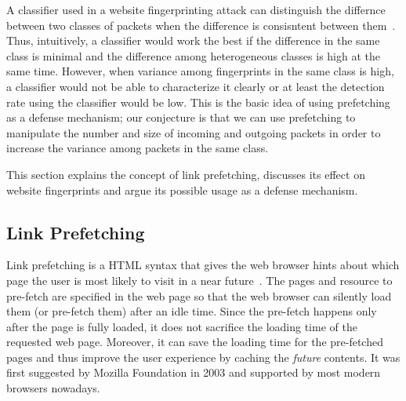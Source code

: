 
A classifier used in a website fingerprinting attack can distinguish the differnce between two classes of packets when the difference is consisntent between them~\cite{Cai:2014kjb}. %
Thus, intuitively, a classifier would work the best if the difference in the same class is minimal and the difference among heterogeneous classes is high at the same time.
However, when variance among fingerprints in the same class is high, a classifier would not be able to characterize it clearly or at least the detection rate using the classifier would be low.
This is the basic idea of using prefetching as a defense mechanism; our conjecture is that we can use prefetching to manipulate the number and size of incoming and outgoing packets in order to increase the variance among packets in the same class.

This section explains the concept of link prefetching, discusses its effect on website fingerprints and argue its possible usage as a defense mechanism.

\subsection{Link Prefetching}

Link prefetching is a HTML syntax that gives the web browser hints about which page the user is most likely to visit in a near future~\cite{fisher2003, fisher2004link}. 
The pages and resource to pre-fetch are specified in the web page so that the web browser can silently load them (or pre-fetch them) after an idle time.
Since the pre-fetch happens only after the page is fully loaded, it does not sacrifice the loading time of the requested web page.
Moreover, it can save the loading time for the pre-fetched pages and thus improve the user experience by caching the {\it future} contents.
It was first suggested by Mozilla Foundation in 2003 and supported by most modern browsers nowadays.

